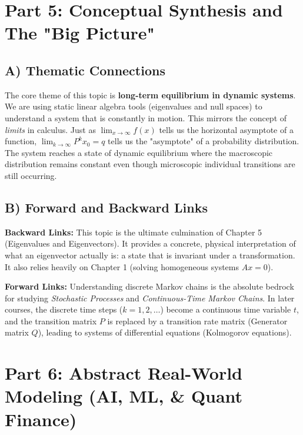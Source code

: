 \documentclass[11pt, letterpaper]{article}
\theoremstyle{definition}
\theoremstyle{remark}
\begin{document}
\newpage
\section{Part 5: Conceptual Synthesis and The "Big Picture"}

\subsection{A) Thematic Connections}
The core theme of this topic is \textbf{long-term equilibrium in dynamic systems}. We are using static linear algebra tools (eigenvalues and null spaces) to understand a system that is constantly in motion. This mirrors the concept of \textit{limits} in calculus. Just as $\lim_{x \to \infty} f(x)$ tells us the horizontal asymptote of a function, $\lim_{k \to \infty} P^k x_0 = q$ tells us the "asymptote" of a probability distribution. The system reaches a state of dynamic equilibrium where the macroscopic distribution remains constant even though microscopic individual transitions are still occurring.

\subsection{B) Forward and Backward Links}
\textbf{Backward Links:} This topic is the ultimate culmination of Chapter 5 (Eigenvalues and Eigenvectors). It provides a concrete, physical interpretation of what an eigenvector actually is: a state that is invariant under a transformation. It also relies heavily on Chapter 1 (solving homogeneous systems $Ax = 0$).

\textbf{Forward Links:} Understanding discrete Markov chains is the absolute bedrock for studying \textit{Stochastic Processes} and \textit{Continuous-Time Markov Chains}. In later courses, the discrete time steps ($k=1, 2, \dots$) become a continuous time variable $t$, and the transition matrix $P$ is replaced by a transition rate matrix (Generator matrix $Q$), leading to systems of differential equations (Kolmogorov equations).

\section{Part 6: Abstract Real-World Modeling (AI, ML, \& Quant Finance)}
\end{document}
